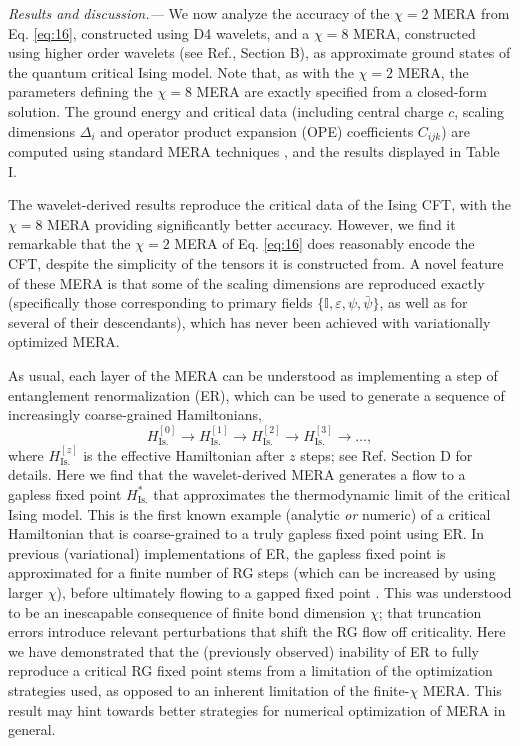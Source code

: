 \documentclass[aps,prl,twocolumn,showpacs,superscriptaddress,floatfix,10pt]{revtex4-1}
\begin{document}
\textit{Results and discussion.---} We now analyze the accuracy of the $\chi=2$
MERA from Eq. \ref{eq:16}, constructed using D4 wavelets, and a
$\chi=8$ MERA, constructed using higher order wavelets (see Ref.\cite{Supp},
Section B), as approximate ground states of the quantum critical Ising model.
Note that, as with the $\chi=2$ MERA, the parameters defining the $\chi=8$ MERA
are exactly specified from a closed-form solution. The ground energy and
critical data \cite{CFTbook1, CFTbook2} (including central charge $c$, scaling
dimensions $\Delta_i$ and operator product expansion (OPE) coefficients
$C_{ijk}$) are computed using standard MERA techniques
\cite{MERAlocal,MERAnonlocal,MERAbook}, and the results displayed in Table I.

The wavelet-derived results reproduce the critical data of the Ising CFT, 
with the $\chi=8$ MERA providing significantly better accuracy. However, we find it remarkable that the $\chi=2$ MERA of Eq. \ref{eq:16} does reasonably encode the CFT, despite the simplicity of the tensors it is constructed from. A novel feature of these MERA is that some of the scaling dimensions are reproduced exactly (specifically those corresponding to primary fields 
$\{ \mathbb{I},\varepsilon,\psi,\bar{\psi} \}$, as well as for several of their descendants), which has never been achieved with variationally optimized MERA.

As usual, each layer of the MERA can be understood as implementing a step of entanglement renormalization (ER), which can be used to generate a sequence of increasingly coarse-grained Hamiltonians, 
\begin{equation}
H_\textrm{Is.}^{[0]} \to H_\textrm{Is.}^{[1]} \to H_\textrm{Is.}^{[2]} \to H_\textrm{Is.}^{[3]} \to \ldots, \label{eq:17}
\end{equation}
where $H_\textrm{Is.}^{[z]}$ is the effective Hamiltonian after $z$ steps; see Ref.\cite{Supp} Section D for details. Here we find that the wavelet-derived MERA generates a flow to a gapless fixed point $H_\textrm{Is.}^{*}$ that approximates the thermodynamic limit of the critical Ising model. This is the first known example (analytic
\emph{or} numeric) of a critical Hamiltonian that is coarse-grained to a truly gapless fixed point using ER. In previous (variational) implementations of ER,
the gapless fixed point is approximated for a finite number of RG steps (which
can be increased by using larger $\chi$), before ultimately flowing to a gapped
fixed point \cite{TNR}. This was understood to be an inescapable consequence of
finite bond dimension $\chi$; that truncation errors introduce
relevant perturbations that shift the RG flow off criticality. Here we
have demonstrated that the (previously observed) inability of ER to fully
reproduce a critical RG fixed point stems from a limitation of the optimization
strategies used, as opposed to an inherent limitation of the finite-$\chi$
MERA. This result may hint towards better strategies for numerical optimization of MERA in general. 
\end{document}
